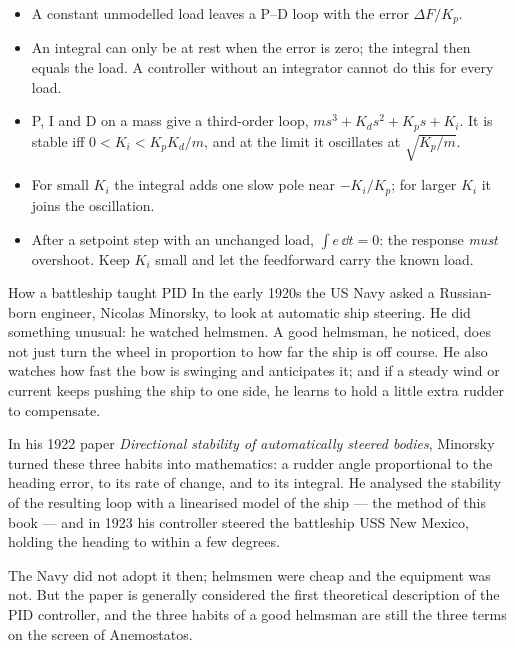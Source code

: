 \begin{remember}
\begin{itemize}
  \item A constant unmodelled load leaves a P–D loop with the error $\Delta F/K_p$.
  \item An integral can only be at rest when the error is zero; the integral then equals the load. A controller without an integrator cannot do this for every load.
  \item P, I and D on a mass give a third-order loop, $m s^3 + K_d s^2 + K_p s + K_i$. It is stable iff $0 < K_i < K_pK_d/m$, and at the limit it oscillates at $\sqrt{K_p/m}$.
  \item For small $K_i$ the integral adds one slow pole near $-K_i/K_p$; for larger $K_i$ it joins the oscillation.
  \item After a setpoint step with an unchanged load, $\int e\,\dd t = 0$: the response \emph{must} overshoot. Keep $K_i$ small and let the feedforward carry the known load.
\end{itemize}
\end{remember}

\begin{curiosity}{How a battleship taught PID}
In the early 1920s the US Navy asked a Russian-born engineer, Nicolas Minorsky, to look at automatic ship steering. He did something unusual: he watched helmsmen. A good helmsman, he noticed, does not just turn the wheel in proportion to how far the ship is off course. He also watches how fast the bow is swinging and anticipates it; and if a steady wind or current keeps pushing the ship to one side, he learns to hold a little extra rudder to compensate.

In his 1922 paper \emph{Directional stability of automatically steered bodies}, Minorsky turned these three habits into mathematics: a rudder angle proportional to the heading error, to its rate of change, and to its integral. He analysed the stability of the resulting loop with a linearised model of the ship — the method of this book — and in 1923 his controller steered the battleship USS New Mexico, holding the heading to within a few degrees.

The Navy did not adopt it then; helmsmen were cheap and the equipment was not. But the paper is generally considered the first theoretical description of the PID controller, and the three habits of a good helmsman are still the three terms on the screen of Anemostatos.
\end{curiosity}

